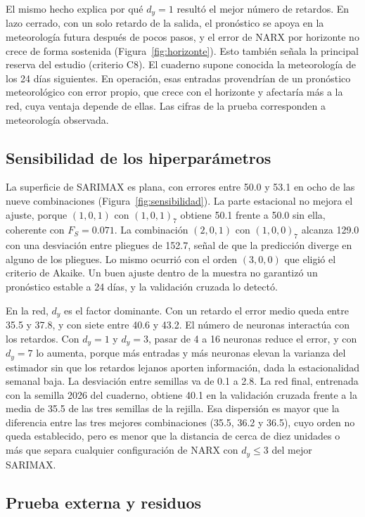 \documentclass[11pt,letterpaper]{article}
\begin{document}
El mismo hecho explica por qué $d_y=1$ resultó el mejor número de retardos. En lazo cerrado, con un solo retardo de la salida, el pronóstico se apoya en la meteorología futura después de pocos pasos, y el error de NARX por horizonte no crece de forma sostenida (Figura~\ref{fig:horizonte}). Esto también señala la principal reserva del estudio (criterio C8). El cuaderno supone conocida la meteorología de los 24 días siguientes. En operación, esas entradas provendrían de un pronóstico meteorológico con error propio, que crece con el horizonte y afectaría más a la red, cuya ventaja depende de ellas. Las cifras de la prueba corresponden a meteorología observada.

\subsection{Sensibilidad de los hiperparámetros}

La superficie de SARIMAX es plana, con errores entre 50.0 y 53.1 en ocho de las nueve combinaciones (Figura~\ref{fig:sensibilidad}). La parte estacional no mejora el ajuste, porque $(1,0,1)$ con $(1,0,1)_7$ obtiene 50.1 frente a 50.0 sin ella, coherente con $F_S=0.071$. La combinación $(2,0,1)$ con $(1,0,0)_7$ alcanza 129.0 con una desviación entre pliegues de 152.7, señal de que la predicción diverge en alguno de los pliegues. Lo mismo ocurrió con el orden $(3,0,0)$ que eligió el criterio de Akaike. Un buen ajuste dentro de la muestra no garantizó un pronóstico estable a 24 días, y la validación cruzada lo detectó.

En la red, $d_y$ es el factor dominante. Con un retardo el error medio queda entre 35.5 y 37.8, y con siete entre 40.6 y 43.2. El número de neuronas interactúa con los retardos. Con $d_y=1$ y $d_y=3$, pasar de 4 a 16 neuronas reduce el error, y con $d_y=7$ lo aumenta, porque más entradas y más neuronas elevan la varianza del estimador sin que los retardos lejanos aporten información, dada la estacionalidad semanal baja. La desviación entre semillas va de 0.1 a 2.8. La red final, entrenada con la semilla 2026 del cuaderno, obtiene 40.1 en la validación cruzada frente a la media de 35.5 de las tres semillas de la rejilla. Esa dispersión es mayor que la diferencia entre las tres mejores combinaciones (35.5, 36.2 y 36.5), cuyo orden no queda establecido, pero es menor que la distancia de cerca de diez unidades o más que separa cualquier configuración de NARX con $d_y\le3$ del mejor SARIMAX.

\subsection{Prueba externa y residuos}
\end{document}
